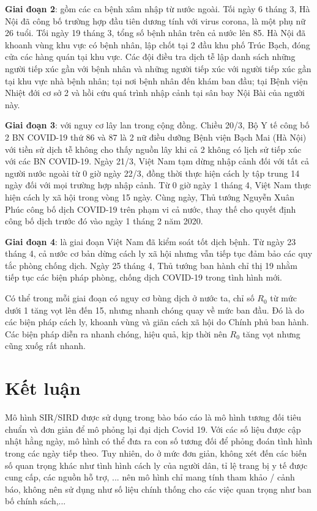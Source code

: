 \documentclass[a4paper]{article}
\begin{document}
\textbf{Giai đoạn 2}: gồm các ca bệnh xâm nhập từ nước ngoài. Tối ngày 6 tháng 3, Hà Nội đã công bố trường hợp đầu tiên dương tính với virus corona, là một phụ nữ 26 tuổi. Tối ngày 19 tháng 3, tổng số bệnh nhân trên cả nước lên 85. Hà Nội đã khoanh vùng khu vực có bệnh nhân, lập chốt tại 2 đầu khu phố Trúc Bạch, đóng cửa các hàng quán tại khu vực. Các đội điều tra dịch tễ lập danh sách những người tiếp xúc gần với bệnh nhân và những người tiếp xúc với người tiếp xúc gần tại khu vực nhà bệnh nhân; tại nơi bệnh nhân đến khám ban đầu; tại Bệnh viện Nhiệt đới cơ sở 2 và hồi cứu quá trình nhập cảnh tại sân bay Nội Bài của người này.

\textbf{Giai đoạn 3}: với nguy cơ lây lan trong cộng đồng. Chiều 20/3, Bộ Y tế công bố 2 BN COVID-19 thứ 86 và 87 là 2 nữ điều dưỡng Bệnh viện Bạch Mai (Hà Nội) với tiền sử dịch tễ không cho thấy nguồn lây khi cả 2 không có lịch sử tiếp xúc với các BN COVID-19. Ngày 21/3, Việt Nam tạm dừng nhập cảnh đối với tất cả người nước ngoài từ 0 giờ ngày 22/3, đồng thời thực hiện cách ly tập trung 14 ngày đối với mọi trường hợp nhập cảnh. Từ 0 giờ ngày 1 tháng 4, Việt Nam thực hiện cách ly xã hội trong vòng 15 ngày. Cùng ngày, Thủ tướng Nguyễn Xuân Phúc công bố dịch COVID-19 trên phạm vi cả nước, thay thế cho quyết định công bố dịch trước đó vào ngày 1 tháng 2 năm 2020.

\textbf{Giai đoạn 4}: là giai đoạn Việt Nam đã kiểm soát tốt dịch bệnh. Từ ngày 23 tháng 4, cả nước cơ bản dừng cách ly xã hội nhưng vẫn tiếp tục đảm bảo các quy tắc phòng chống dịch. Ngày 25 tháng 4, Thủ tướng ban hành chỉ thị 19 nhằm tiếp tục các biện pháp phòng, chống dịch COVID-19 trong tình hình mới.

Có thể trong mỗi giai đoạn có nguy cơ bùng dịch ở nước ta, chỉ số $R_0$ từ mức dưới 1 tăng vọt lên đến 15, nhưng nhanh chóng quay về mức ban đầu. Đó là do các biện pháp cách ly, khoanh vùng và giãn cách xã hội do Chính phủ ban hành. Các biện pháp diễn ra nhanh chóng, hiệu quả, kịp thời nên $R_0$ tăng vọt nhưng cũng xuốg rất nhanh.


\section{Kết luận}
Mô hình SIR/SIRD được sử dụng trong bào báo cáo là mô hình tương đối tiêu chuẩn và đơn giản để mô phỏng lại đại dịch Covid 19. Với các số liệu được cập nhật hằng ngày, mô hình có thể đưa ra con số tương đối để phỏng đoán tình hình trong các ngày tiếp theo. Tuy nhiên, do ở mức đơn giản, không xét đến các biến số quan trọng khác như tình hình cách ly của người dân, tỉ lệ trang bị y tế được cung cấp, các nguồn hỗ trợ, ... nên mô hình chỉ mang tính tham khảo / cảnh báo, không nên sử dụng như số liệu chính thống cho các việc quan trọng như ban bố chính sách,...
 
\end{document}
